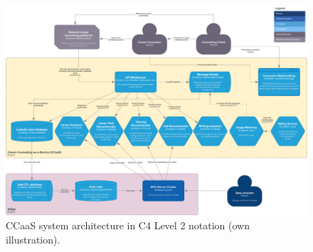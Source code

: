 \begin{landscape}
    \begin{figure}
        \centering
        \caption{CCaaS system architecture in C4 Level 2 notation (own illustration).}
        \label{fig:system_architecture}
        \includegraphics[width=\textwidth]{figures/c4_system_architecture.pdf}
    \end{figure}        
\end{landscape}


